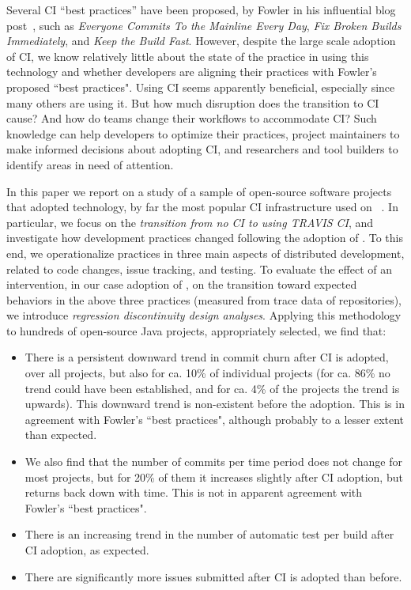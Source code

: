 Several CI ``best practices'' have been proposed, \eg by Fowler in his 
influential blog post~\cite{fowler2000continuous}, such as 
\emph{Everyone Commits To the Mainline Every Day}, 
\emph{Fix Broken Builds Immediately},
and \emph{Keep the Build Fast}.
However, despite the large scale adoption of CI, we know relatively little 
about the state of the practice in using this technology and whether 
developers are aligning their practices with Fowler's proposed ``best practices".
Using CI seems apparently beneficial, especially since many others are using it.
But how much disruption does the transition to CI cause?
And how do teams change their workflows to accommodate CI?
Such knowledge can help developers to optimize their practices, project 
maintainers to make informed decisions about adopting CI, and 
researchers and tool builders to identify areas in need of attention.

In this paper we report on a study of a sample of \GH open-source 
software projects that adopted \Tvis technology, by far the most popular 
CI infrastructure used on \GH~\cite{Hilton2016}.
In particular, we focus on the \emph{transition from no CI to using 
T{\footnotesize RAVIS} CI}, and investigate how development practices 
changed following the adoption of \Tvis.
To this end, we operationalize practices in three main aspects of 
distributed development, related to code changes, issue tracking, 
and testing.
To evaluate the effect of an intervention, in our case adoption of
\Tvis, on the transition toward expected behaviors in the above 
three practices (measured from trace data of \GH repositories),
we introduce \emph{regression discontinuity design analyses}.
Applying this methodology to hundreds of open-source Java 
projects, appropriately selected, we find that:


\begin{itemize}

\item There is a persistent downward trend in commit churn after 
CI is adopted, over all projects, but also for ca. 10\% of 
individual projects (for ca. 86\% no trend could have been established,
and for ca. 4\% of the projects the trend is upwards). 
This downward trend is non-existent before the adoption. 
This is in agreement with Fowler's ``best practices", although 
probably to a lesser extent than expected.

\item We also find that the number of commits per time period does 
not change for most projects, but for 20\% of them it increases slightly 
after CI adoption, but returns back down with time.
This is not in apparent agreement with Fowler's ``best practices".

\item There is an increasing trend in the number of automatic test 
per build after CI adoption, as expected.

\item There are significantly more issues submitted after CI is 
adopted than before.

\end{itemize}


